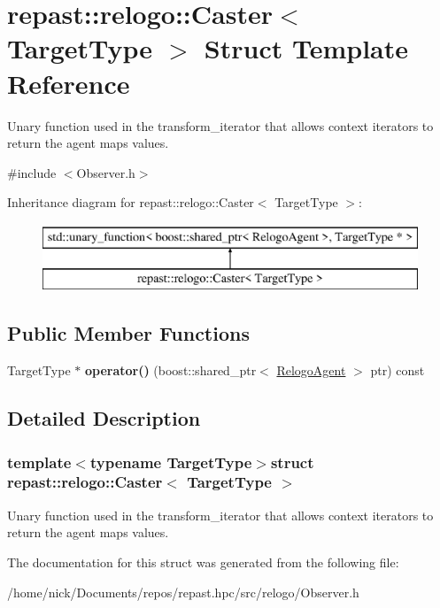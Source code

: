 \hypertarget{structrepast_1_1relogo_1_1_caster}{\section{repast\-:\-:relogo\-:\-:Caster$<$ Target\-Type $>$ Struct Template Reference}
\label{structrepast_1_1relogo_1_1_caster}
}


Unary function used in the transform\-\_\-iterator that allows context iterators to return the agent maps values.  




{\ttfamily \#include $<$Observer.\-h$>$}

Inheritance diagram for repast\-:\-:relogo\-:\-:Caster$<$ Target\-Type $>$\-:\begin{figure}[H]
\begin{center}
\leavevmode
\includegraphics[height=2.000000cm]{structrepast_1_1relogo_1_1_caster}
\end{center}
\end{figure}
\subsection*{Public Member Functions}
\begin{DoxyCompactItemize}
\item 
\hypertarget{structrepast_1_1relogo_1_1_caster_ad472a8ecc1aa129b9c35728d44ce9940}{Target\-Type $\ast$ {\bfseries operator()} (boost\-::shared\-\_\-ptr$<$ \hyperlink{classrepast_1_1relogo_1_1_relogo_agent}{Relogo\-Agent} $>$ ptr) const }\label{structrepast_1_1relogo_1_1_caster_ad472a8ecc1aa129b9c35728d44ce9940}

\end{DoxyCompactItemize}


\subsection{Detailed Description}
\subsubsection*{template$<$typename Target\-Type$>$struct repast\-::relogo\-::\-Caster$<$ Target\-Type $>$}

Unary function used in the transform\-\_\-iterator that allows context iterators to return the agent maps values. 

The documentation for this struct was generated from the following file\-:\begin{DoxyCompactItemize}
\item 
/home/nick/\-Documents/repos/repast.\-hpc/src/relogo/Observer.\-h\end{DoxyCompactItemize}
